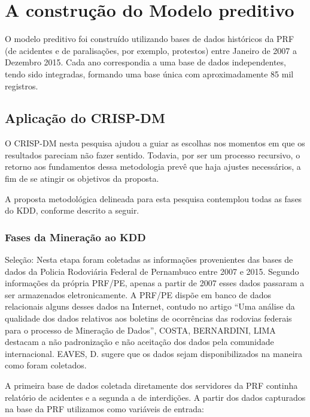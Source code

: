\section{A construção do Modelo preditivo}

O modelo preditivo foi construído utilizando bases de dados históricos da PRF (de acidentes e de paralisações, por exemplo,  protestos) entre Janeiro de 2007 a Dezembro 2015. Cada ano correspondia a uma base de dados independentes, tendo sido integradas, formando uma base única com aproximadamente 85 mil registros. 


\subsection{Aplicação do CRISP-DM}
O CRISP-DM nesta pesquisa ajudou a guiar as escolhas nos momentos em que os resultados pareciam não fazer sentido. Todavia, por ser um processo recursivo, o retorno aos fundamentos dessa metodologia prevê que haja ajustes necessários, a fim de se atingir os objetivos da proposta.

A proposta metodológica delineada para esta pesquisa contemplou todas as fases do KDD, conforme descrito a seguir.

\subsubsection{Fases da Mineração ao KDD}

Seleção: Nesta etapa foram coletadas as informações provenientes das bases de dados da Policia Rodoviária Federal de Pernambuco entre 2007 e 2015. Segundo informações da própria PRF/PE, apenas a partir de 2007 esses dados passaram a ser armazenados eletronicamente. A PRF/PE dispõe em banco de dados relacionais alguns desses dados na Internet,
contudo no artigo “Uma análise da qualidade dos dados relativos aos boletins de ocorrências das rodovias federais para
o processo de Mineração de Dados”, COSTA, BERNARDINI, LIMA \cite{Costa2015} destacam a não padronização e não aceitação dos
dados pela comunidade internacional. EAVES, D. \cite{Eaves} sugere que os dados sejam disponibilizados na maneira como foram
coletados. 

A primeira base de dados coletada diretamente dos servidores da PRF continha relatório de acidentes e a segunda a de interdições. A partir dos dados capturados na base da PRF utilizamos como variáveis de entrada:


